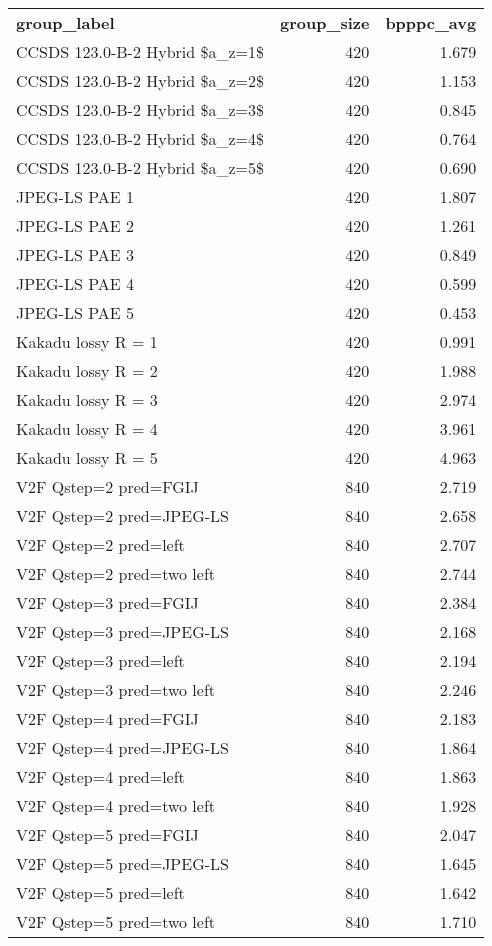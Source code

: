 \begin{tabular}{lrr}
\textbf{ group\_label } & \textbf{ group\_size } & \textbf{ bpppc\_avg } \\
CCSDS 123.0-B-2 Hybrid \$a\_z=1\$ & 420 & 1.679 \\
CCSDS 123.0-B-2 Hybrid \$a\_z=2\$ & 420 & 1.153 \\
CCSDS 123.0-B-2 Hybrid \$a\_z=3\$ & 420 & 0.845 \\
CCSDS 123.0-B-2 Hybrid \$a\_z=4\$ & 420 & 0.764 \\
CCSDS 123.0-B-2 Hybrid \$a\_z=5\$ & 420 & 0.690 \\
JPEG-LS PAE 1 & 420 & 1.807 \\
JPEG-LS PAE 2 & 420 & 1.261 \\
JPEG-LS PAE 3 & 420 & 0.849 \\
JPEG-LS PAE 4 & 420 & 0.599 \\
JPEG-LS PAE 5 & 420 & 0.453 \\
Kakadu lossy R = 1 & 420 & 0.991 \\
Kakadu lossy R = 2 & 420 & 1.988 \\
Kakadu lossy R = 3 & 420 & 2.974 \\
Kakadu lossy R = 4 & 420 & 3.961 \\
Kakadu lossy R = 5 & 420 & 4.963 \\
V2F Qstep=2 pred=FGIJ & 840 & 2.719 \\
V2F Qstep=2 pred=JPEG-LS & 840 & 2.658 \\
V2F Qstep=2 pred=left & 840 & 2.707 \\
V2F Qstep=2 pred=two left & 840 & 2.744 \\
V2F Qstep=3 pred=FGIJ & 840 & 2.384 \\
V2F Qstep=3 pred=JPEG-LS & 840 & 2.168 \\
V2F Qstep=3 pred=left & 840 & 2.194 \\
V2F Qstep=3 pred=two left & 840 & 2.246 \\
V2F Qstep=4 pred=FGIJ & 840 & 2.183 \\
V2F Qstep=4 pred=JPEG-LS & 840 & 1.864 \\
V2F Qstep=4 pred=left & 840 & 1.863 \\
V2F Qstep=4 pred=two left & 840 & 1.928 \\
V2F Qstep=5 pred=FGIJ & 840 & 2.047 \\
V2F Qstep=5 pred=JPEG-LS & 840 & 1.645 \\
V2F Qstep=5 pred=left & 840 & 1.642 \\
V2F Qstep=5 pred=two left & 840 & 1.710 \\

\end{tabular}

